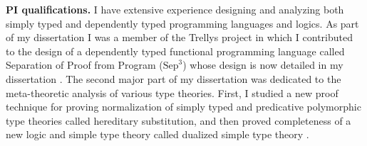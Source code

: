 \begin{full}
\textbf{PI qualifications.} I have extensive experience designing and
analyzing both simply typed and dependently typed programming
languages and logics.  As part of my dissertation I was a member of
the Trellys project
\cite{Casinghino:2012,Kimmel:2013,Sjoberg:2015,Sjoberg:2012} in which
I contributed to the design of a dependently typed functional
programming language called Separation of Proof from Program
($\text{Sep}^3$) whose design is now detailed in my dissertation
\cite{Eades:2014b,Kimmel:2013}.  The second major part of my
dissertation was dedicated to the meta-theoretic analysis of various
type theories.  First, I studied a new proof technique for proving
normalization of simply typed and predicative polymorphic type
theories called hereditary substitution, and then proved completeness
of a new logic and simple type theory called dualized simple type
theory \cite{Eades:2014b}.

\end{full}
